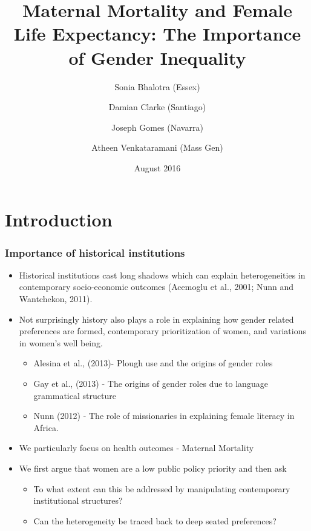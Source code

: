 \documentclass[10pt,letterpaper,subeqn]{beamer}
\title[Women's Health and Gender Inequality]{Maternal Mortality and Female Life 
Expectancy: The Importance of Gender Inequality}
\author[Bhalotra et al.]{Sonia Bhalotra (Essex)
    \and Damian Clarke (Santiago) \\ \vspace{1mm}
    \and Joseph Gomes (Navarra)
    \and Atheen Venkataramani (Mass Gen)}
\date{August 2016}
\begin{document}
\begin{frame}
\titlepage
\end{frame}



\section{Introduction}
\begin{frame}[label=intro]
\frametitle{Importance of historical institutions}
\begin{itemize}
  \setlength{\itemsep}{10pt}
	\item Historical institutions cast long shadows which can explain heterogeneities in contemporary socio-economic outcomes (Acemoglu et al., 2001; Nunn and Wantchekon, 2011).
	\item Not surprisingly history also plays a role in explaining how gender related preferences are formed, contemporary prioritization of women, and variations in women's well being.
	\begin{itemize}
		\item Alesina et al., (2013)- Plough use and the origins of gender roles 
		\item Gay et al., (2013) - The origins of gender roles due to language grammatical structure 
		\item Nunn (2012) - The role of missionaries in explaining female literacy in Africa.
	\end{itemize}
	\item We particularly focus on health outcomes - Maternal Mortality
	\item We first argue that women are a low public policy priority and then ask
	\begin{itemize}
		\item To what extent can this be addressed by manipulating contemporary institutional structures? 
		\item Can the heterogeneity be traced back to deep seated preferences?
	\end{itemize}
\end{itemize}
\end{frame}
\end{document}
